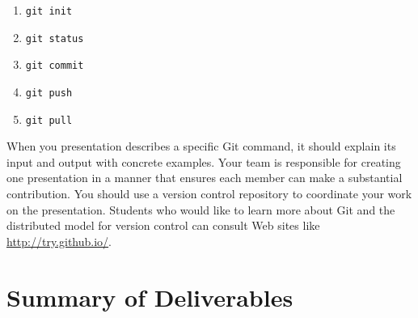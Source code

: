 		\begin{enumerate} 
			
			\item {\tt git init}

			\item {\tt git status}

			\item {\tt git commit}

			\item {\tt git push}

			\item {\tt git pull} 
		
		\end{enumerate}



When you presentation describes a specific Git command, it should explain its input and output with concrete examples.
Your team is responsible for creating one presentation in a manner that ensures each member can make a substantial
contribution. You should use a version control repository to coordinate your work on the presentation.  Students who
would like to learn more about Git and the distributed model for version control can consult Web sites like
\url{http://try.github.io/}. 

\section*{Summary of Deliverables}


